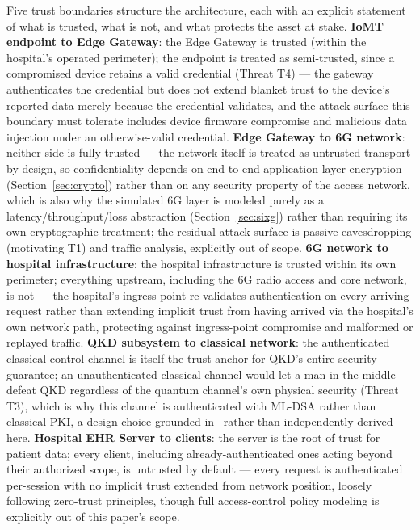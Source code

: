 \documentclass[journal]{IEEEtran}
\begin{document}
Five trust boundaries structure the architecture, each with an explicit statement of what is trusted, what is not, and what protects the asset at stake. \textbf{IoMT endpoint to Edge Gateway}: the Edge Gateway is trusted (within the hospital's operated perimeter); the endpoint is treated as semi-trusted, since a compromised device retains a valid credential (Threat T4) --- the gateway authenticates the credential but does not extend blanket trust to the device's reported data merely because the credential validates, and the attack surface this boundary must tolerate includes device firmware compromise and malicious data injection under an otherwise-valid credential. \textbf{Edge Gateway to 6G network}: neither side is fully trusted --- the network itself is treated as untrusted transport by design, so confidentiality depends on end-to-end application-layer encryption (Section~\ref{sec:crypto}) rather than on any security property of the access network, which is also why the simulated 6G layer is modeled purely as a latency/throughput/loss abstraction (Section~\ref{sec:sixg}) rather than requiring its own cryptographic treatment; the residual attack surface is passive eavesdropping (motivating T1) and traffic analysis, explicitly out of scope. \textbf{6G network to hospital infrastructure}: the hospital infrastructure is trusted within its own perimeter; everything upstream, including the 6G radio access and core network, is not --- the hospital's ingress point re-validates authentication on every arriving request rather than extending implicit trust from having arrived via the hospital's own network path, protecting against ingress-point compromise and malformed or replayed traffic. \textbf{QKD subsystem to classical network}: the authenticated classical control channel is itself the trust anchor for QKD's entire security guarantee; an unauthenticated classical channel would let a man-in-the-middle defeat QKD regardless of the quantum channel's own physical security (Threat T3), which is why this channel is authenticated with ML-DSA rather than classical PKI, a design choice grounded in~\cite{atutxasanz2025authentication} rather than independently derived here. \textbf{Hospital EHR Server to clients}: the server is the root of trust for patient data; every client, including already-authenticated ones acting beyond their authorized scope, is untrusted by default --- every request is authenticated per-session with no implicit trust extended from network position, loosely following zero-trust principles, though full access-control policy modeling is explicitly out of this paper's scope.
\end{document}
